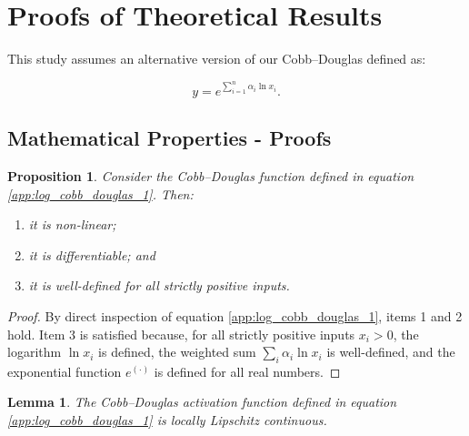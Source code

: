 \documentclass[preprint,12pt,authoryear]{sn-jnl}
\newtheorem{lemma}{Lemma}
\newtheorem{proposition}{Proposition}
\begin{document}
\begin{singlespace}


\end{singlespace}

\appendix
\section{Proofs of Theoretical Results} \label{appendix:proofs}

This study assumes an alternative version of our Cobb–Douglas defined as:

\begin{equation} \label{app:log_cobb_douglas_1}
y = e^{\sum_{i=1}^n \alpha_i \ln x_i}.
\end{equation}

\subsection{Mathematical Properties - Proofs}

\setcounter{proposition}{0}
\begin{proposition}\label{app:proposition_1}
Consider the Cobb--Douglas function defined in equation \ref{app:log_cobb_douglas_1}. Then:
\begin{enumerate}
    \item it is non-linear;
    \item it is differentiable; and
    \item it is well-defined for all strictly positive inputs.
\end{enumerate}
\end{proposition}

\begin{proof}
By direct inspection of equation \ref{app:log_cobb_douglas_1}, items 1 and 2 hold. Item 3 is satisfied because, for all strictly positive inputs \(x_i > 0\), the logarithm \(\ln x_i\) is defined, the weighted sum \(\sum_i \alpha_i \ln x_i\) is well-defined, and the exponential function \(e^{(\cdot)}\) is defined for all real numbers.
\end{proof}

\setcounter{lemma}{0}
\begin{lemma} \label{app:lemma_continuity}
The Cobb--Douglas activation function defined in equation \ref{app:log_cobb_douglas_1} is locally Lipschitz continuous.
\end{lemma}
\end{document}
